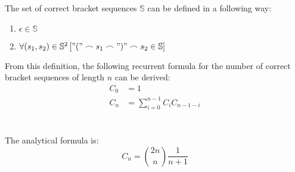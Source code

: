 The set of correct bracket sequences $\mathbb{S}$ can be defined in a following way:
\begin{enumerate}
  \item $\epsilon \in \mathbb{S}$
  \item $\forall (s_1, s_2) \in \mathbb{S}^2\left["(" \frown s_1 \frown ")" \frown s_2 \in \mathbb{S}\right]$
\end{enumerate}
From this definition, the following recurrent formula for the number of correct bracket sequences of length $n$ can be derived:
\begin{align*}
  C_0 &= 1 \\
  C_n &= \sum\limits_{i=0}^{n - 1} C_i C_{n - 1 - i}
\end{align*}
\\ \\
The analytical formula is:
\begin{equation*}
  C_n = \binom{2n}{n} \frac{1}{n + 1}
\end{equation*}

